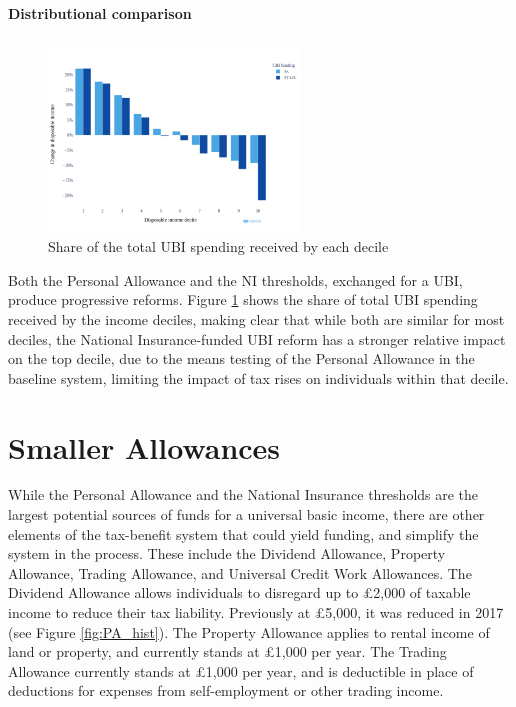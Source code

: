 \documentclass{article}
\begin{document}
    \paragraph{Distributional comparison}

    \begin{figure}
        \centering
        \includegraphics[width=0.6\textwidth]{images/fig_10.png}
        \caption{Share of the total UBI spending received by each decile}
        \label{fig:PA_NI_distr_comp}
    \end{figure}

    Both the Personal Allowance and the NI thresholds, exchanged for a UBI, produce progressive reforms. Figure \ref{fig:PA_NI_distr_comp} shows the share of total UBI spending received by the income deciles, making clear that while both are similar for most deciles, the National Insurance-funded UBI reform has a stronger relative impact on the top decile, due to the means testing of the Personal Allowance in the baseline system, limiting the impact of tax rises on individuals within that decile.

    \section{Smaller Allowances}

    While the Personal Allowance and the National Insurance thresholds are the largest potential sources of funds for a universal basic income, there are other elements of the tax-benefit system that could yield funding, and simplify the system in the process. These include the Dividend Allowance, Property Allowance, Trading Allowance, and Universal Credit Work Allowances. The Dividend Allowance allows individuals to disregard up to £2,000 of taxable income to reduce their tax liability. Previously at £5,000, it was reduced in 2017 (see Figure \ref{fig:PA_hist}). The Property Allowance applies to rental income of land or property, and currently stands at £1,000 per year. The Trading Allowance currently stands at £1,000 per year, and is deductible in place of deductions for expenses from self-employment or other trading income.
\end{document}
